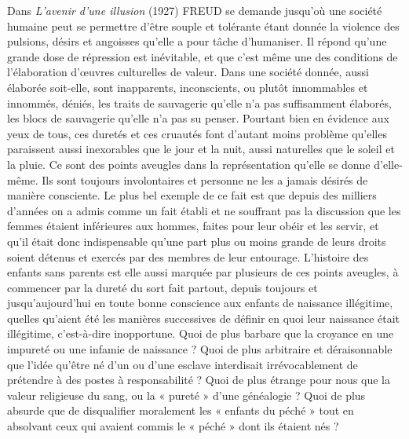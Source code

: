  Dans \emph{L'avenir d'une illusion} (1927) FREUD se demande jusqu'où une société humaine peut se permettre d'être souple et tolérante étant donnée la violence des pulsions, désirs et angoisses qu'elle a pour tâche d'humaniser. Il répond qu'une grande dose de répression est inévitable, et que c'est même une des conditions de l'élaboration d'œuvres culturelles de valeur.
 Dans une société donnée, aussi élaborée soit-elle, sont inapparents, inconscients, ou plutôt innommables et innommés, déniés, les traits de sauvagerie qu'elle n'a pas suffisamment élaborés, les blocs de sauvagerie qu'elle n'a pas su penser. Pourtant bien en évidence aux yeux de tous, ces duretés et ces cruautés font d'autant moins problème qu'elles paraissent aussi inexorables que le jour et la nuit, aussi naturelles que le soleil et la pluie. Ce sont des points aveugles dans la représentation qu'elle se donne d'elle-même. Ils sont toujours involontaires et personne ne les a jamais désirés de manière consciente. 
 Le plus bel exemple de ce fait est que depuis des milliers d'années on a admis comme un fait établi et ne souffrant pas la discussion que les femmes étaient inférieures aux hommes, faites pour leur obéir et les servir, et qu'il était donc indispensable qu'une part plus ou moins grande de leurs droits soient détenus et exercés par des membres de leur entourage. 
 L'histoire des enfants sans parents est elle aussi marquée par plusieurs de ces points aveugles, à commencer par la dureté du sort fait partout, depuis toujours et jusqu'aujourd'hui en toute bonne conscience aux enfants de naissance illégitime, quelles qu'aient été les manières successives de définir en quoi leur naissance était illégitime, c'est-à-dire inopportune. Quoi de plus barbare que la croyance en une impureté ou une infamie de naissance ? Quoi de plus arbitraire et déraisonnable que l'idée qu'être né d'un ou d'une esclave interdisait irrévocablement de prétendre à des postes à responsabilité ? Quoi de plus étrange pour nous que la valeur religieuse du sang, ou la « pureté » d'une généalogie ? Quoi de plus absurde que de disqualifier moralement les « enfants du péché » tout en absolvant ceux qui avaient commis le « péché » dont ils étaient nés ? 
